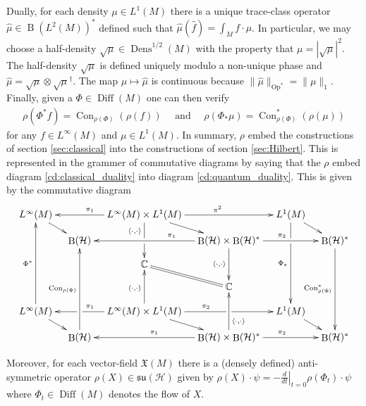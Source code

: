 \documentclass[12pt]{amsart}
\renewcommand{\H}{\ensuremath{\mathcal{H}}}
\DeclareMathOperator{\Diff}{Diff}
\DeclareMathOperator{\Dens}{Dens}
\DeclareMathOperator{\B}{B}
\DeclareMathOperator{\Op}{Op}
\DeclareMathOperator{\Con}{Con}
\begin{document}
Dually, for each density $\mu \in L^1(M)$ there is a unique trace-class operator $\hat{\mu} \in \B(L^2(M))^*$ defined
such that $ \hat{\mu} (\hat{f}) = \int_M f \cdot \mu $.
In particular, we may choose a half-density $\sqrt{\mu} \in \Dens^{1/2}(M)$ with the property that $\mu = |\sqrt{\mu}|^{2}$.
The half-density $\sqrt{\mu}$ is defined uniquely modulo a non-unique phase and $\hat{\mu} = \sqrt{\mu} \otimes \sqrt{\mu}^\dagger$.
The map $\mu \mapsto \hat{\mu}$ is continuous because $\| \hat{\mu} \|_{\Op^*} = \| \mu \|_{1}$.
Finally, given a $\Phi \in \Diff(M)$ one can then verify
\begin{align*}
	\rho( \Phi^* f ) = \Con_{\rho(\Phi)} ( \rho(f)) \quad \text{ and } \quad
	\rho( \Phi_* \mu) = \Con_{\rho(\Phi)}^*(\rho(\mu) )
\end{align*}
for any $f \in L^\infty(M)$ and $\mu \in L^1(M)$.
In summary, $\rho$ embed the constructions of section \ref{sec:classical} into the constructions of section \ref{sec:Hilbert}.
This is represented in the grammer of commutative diagrams by saying that the $\rho$ embed diagram \eqref{cd:classical_duality}
into diagram \eqref{cd:quantum_duality}.
This is given by the commutative diagram
\begin{equation}
	\xymatrix@=1em{
		L^\infty(M) \ar[dr] & & \ar[ll]_{\pi_1} L^\infty(M) \times L^1(M) \ar[dd]_<(0.2){\langle \cdot ,\cdot \rangle}|!{[dr];[dl]}\hole  \ar[dr] \ar[rr]^{\pi^2} & & L^1(M) \ar[dr] \ar[dddd]_{\Phi_*}|!{[dl];[dr]}\hole & \\
		& \B(\H) & & \ar[ll]_<(0.2){\pi_1} \B(\H) \times \B(\H)^* \ar[dd]_{\langle \cdot ,\cdot \rangle} \ar[rr]^{\pi_2} & & \B(\H)^* \ar[dddd]_{\Con^*_{\rho(\Phi)}} \\
		& & \mathbb{C} \ar@{=}[dr] & & & \\
		& & & \mathbb{C} & & \\
		L^\infty(M) \ar[dr] \ar[uuuu]^{\Phi^*} & & \ar[ll]_{\pi_1}|!{[dl];[uuul]}\hole L^\infty(M) \times L^1(M) \ar[dr]  \ar[rr]^<(0.2){\pi_2}|!{[dr];[ur]}\hole \ar[uu]^{\langle \cdot,\cdot \rangle} & & L^1(M) \ar[dr] & \\
		& \B(\H) \ar[uuuu]^{\Con_{\rho(\Phi)}} & & \ar[ll]_{\pi_1} \B(\H) \times \B(\H)^* \ar[uu]_<(0.2){\langle \cdot , \cdot \rangle} \ar[rr]^{\pi_2} & & \B(\H)^*
	}
\end{equation}

Moreover, for each vector-field $\mathfrak{X}(M)$ there is a (densely defined) anti-symmetric operator $\rho(X) \in \mathfrak{su}(\H)$
given by $\rho(X) \cdot \psi =  - \left. \frac{d}{dt} \right|_{t=0} \rho(\Phi_t) \cdot \psi$
where $\Phi_t \in \Diff(M)$ denotes the flow of $X$.
\end{document}
